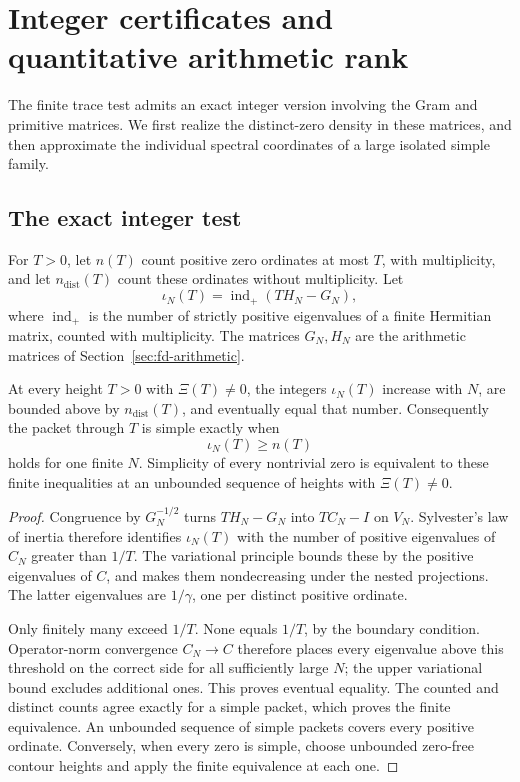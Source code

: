 \section{Integer certificates and quantitative arithmetic rank}
\label{sec:fd-inertia-density}

The finite trace test admits an exact integer version involving the
Gram and primitive matrices. We first realize the distinct-zero density
in these matrices, and then approximate the individual spectral
coordinates of a large isolated simple family.

\subsection{The exact integer test}
For \(T>0\), let \(n(T)\) count positive zero ordinates at most
\(T\), with multiplicity, and let \(n_{\mathrm{dist}}(T)\) count
these ordinates without multiplicity. Let
\[
 \iota_N(T)=\operatorname{ind}_+(T H_N-G_N),
\]
where \(\operatorname{ind}_+\) is the number of strictly positive
eigenvalues of a finite Hermitian matrix, counted with multiplicity.
The matrices \(G_N,H_N\) are the arithmetic matrices of
Section~\ref{sec:fd-arithmetic}.

\begin{proposition}
\label{prop:fd-inertia-complete}
At every height \(T>0\) with \(\Xi(T)\ne0\), the integers
\(\iota_N(T)\) increase with \(N\), are bounded above by
\(n_{\mathrm{dist}}(T)\), and eventually equal that number.
Consequently the packet through \(T\) is simple exactly when
\[
 \iota_N(T)\ge n(T)
\]
holds for one finite \(N\). Simplicity of every nontrivial zero is
equivalent to these finite inequalities at an unbounded sequence of
heights with \(\Xi(T)\ne0\).
\end{proposition}
\begin{proof}
Congruence by \(G_N^{-1/2}\) turns \(T H_N-G_N\) into
\(T C_N-I\) on \(V_N\). Sylvester's law of inertia therefore
identifies \(\iota_N(T)\) with the number of positive eigenvalues
of \(C_N\) greater than \(1/T\). The variational principle bounds
these by the positive eigenvalues of \(C\), and makes them
nondecreasing under the nested projections. The latter eigenvalues
are \(1/\gamma\), one per distinct positive ordinate.

Only finitely many exceed \(1/T\). None equals \(1/T\), by the
boundary condition. Operator-norm convergence \(C_N\to C\)
therefore places every eigenvalue above this threshold on the correct
side for all sufficiently large \(N\); the upper variational bound
excludes additional ones. This proves eventual equality.
The counted and distinct counts agree exactly for a simple packet,
which proves the finite equivalence. An unbounded sequence of simple
packets covers every positive ordinate. Conversely, when every zero
is simple, choose unbounded zero-free contour heights and apply the
finite equivalence at each one.
\end{proof}

